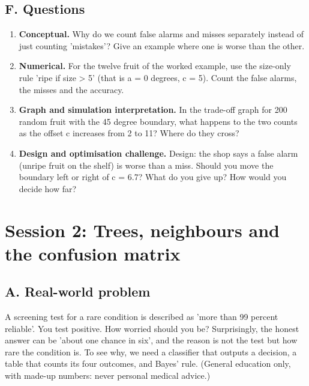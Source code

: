 \documentclass[11pt,a4paper]{article}
\begin{document}
\subsection*{F. Questions}
\begin{enumerate}[nosep]
\item \textbf{Conceptual.} Why do we count false alarms and misses separately instead of just counting 'mistakes'? Give an example where one is worse than the other.
\item \textbf{Numerical.} For the twelve fruit of the worked example, use the size-only rule 'ripe if size \textgreater{} 5' (that is a = 0 degrees, c = 5). Count the false alarms, the misses and the accuracy.
\item \textbf{Graph and simulation interpretation.} In the trade-off graph for 200 random fruit with the 45 degree boundary, what happens to the two counts as the offset c increases from 2 to 11? Where do they cross?
\item \textbf{Design and optimisation challenge.} Design: the shop says a false alarm (unripe fruit on the shelf) is worse than a miss. Should you move the boundary left or right of c = 6.7? What do you give up? How would you decide how far?
\end{enumerate}

\section{Session 2: Trees, neighbours and the confusion matrix}

\subsection*{A. Real-world problem}
A screening test for a rare condition is described as 'more than 99 percent reliable'. You test positive. How worried should you be? Surprisingly, the honest answer can be 'about one chance in six', and the reason is not the test but how rare the condition is. To see why, we need a classifier that outputs a decision, a table that counts its four outcomes, and Bayes' rule. (General education only, with made-up numbers: never personal medical advice.)
\end{document}
